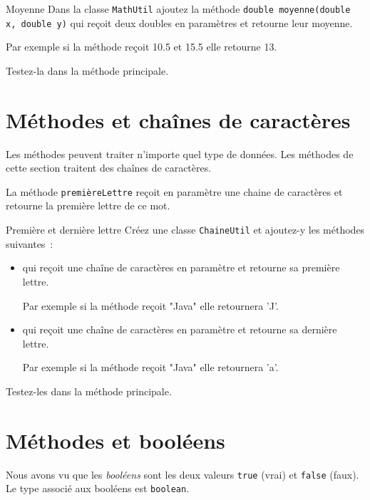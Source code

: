 \documentclass[a4paper,11pt]{style-esi/td}
\begin{document}
		

	 \begin{Exercice}{Moyenne}
		Dans la classe \texttt{MathUtil} ajoutez la méthode 
		\texttt{double moyenne(double x, double y)} qui reçoit deux doubles en paramètres et retourne leur moyenne.
		
		Par exemple si la méthode reçoit 10.5 et 15.5 elle retourne 13.
		
		Testez-la dans la méthode principale.
	\end{Exercice} 

\section{Méthodes et chaînes de caractères}

	Les méthodes peuvent traiter n'importe quel type de données.
	Les méthodes de cette section traitent des chaînes de caractères. 


	La méthode \texttt{premièreLettre} reçoit en paramètre une chaine de caractères et retourne la première lettre de ce mot.

	\begin{Exercice}{Première et dernière lettre}
		Créez une classe \texttt{ChaineUtil} et ajoutez-y les méthodes suivantes~: 
		\begin{itemize}
			\item {} 
				qui reçoit une chaîne de caractères en paramètre et retourne sa première lettre.
				
				Par exemple si la méthode reçoit "Java" elle retournera 'J'.
			\item {} 
				qui reçoit une chaîne de caractères en paramètre et retourne sa dernière lettre.
				
				Par exemple si la méthode reçoit "Java" elle retournera 'a'.
		\end{itemize}
		
		Testez-les dans la méthode principale.
	\end{Exercice} 



\section{Méthodes et booléens}

	Nous avons vu que les \emph{booléens} sont les deux valeurs \texttt{true} (vrai) et \texttt{false} (faux). 
	Le type associé aux booléens est \texttt{boolean}.
	
\end{document}
